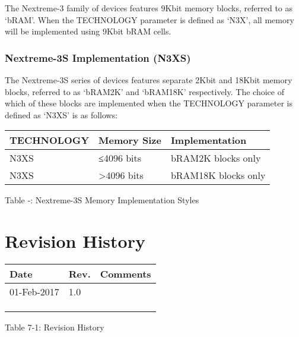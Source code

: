 The Nextreme-3 family of devices features 9Kbit memory blocks, referred
to as `bRAM'. When the TECHNOLOGY parameter is defined as `N3X', all
memory will be implemented using 9Kbit bRAM cells.

\subsubsection{Nextreme-3S Implementation
(N3XS)}\label{nextreme-3s-implementation-n3xs}

The Nextreme-3S series of devices features separate 2Kbit and 18Kbit
memory blocks, referred to as `bRAM2K' and `bRAM18K' respectively. The
choice of which of these blocks are implemented when the TECHNOLOGY
parameter is defined as `N3XS' is as follows:

\begin{longtable}[]{@{}lll@{}}
\toprule
TECHNOLOGY & Memory Size & Implementation\tabularnewline
\midrule
\endhead
N3XS & ≤4096 bits & bRAM2K blocks only\tabularnewline
N3XS & \textgreater{}4096 bits & bRAM18K blocks only\tabularnewline
\bottomrule
\end{longtable}

Table ‑: Nextreme-3S Memory Implementation Styles

\section{Revision History}\label{revision-history}

\begin{longtable}[]{@{}lll@{}}
\toprule
Date & Rev. & Comments\tabularnewline
\midrule
\endhead
01-Feb-2017 & 1.0 &\tabularnewline
& &\tabularnewline
& &\tabularnewline
& &\tabularnewline
\bottomrule
\end{longtable}

Table 7‑1: Revision History
